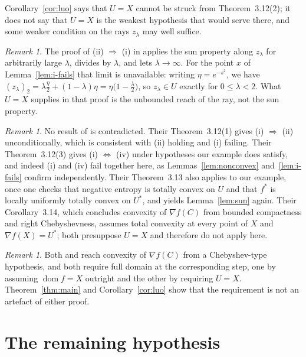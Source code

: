 \documentclass[11pt]{amsart}
\theoremstyle{plain}
\theoremstyle{definition}
\theoremstyle{remark}
\newtheorem{remark}[theorem]{Remark}
\newcommand{\dom}{\operatorname{dom}}
\begin{document}
Corollary~\ref{cor:luo} says that $U = X$ cannot be struck from
Theorem~3.12(2); it does not say that $U = X$ is the weakest hypothesis that
would serve there, and some weaker condition on the rays $z_{\lambda}$ may well
suffice.

\begin{remark}\label{rem:obstruction}
The proof of (ii) $\Rightarrow$ (i) in \cite[Theorem 3.12(2)]{LMWY2019} applies
the sun property along $z_{\lambda}$ for arbitrarily large $\lambda$, divides by
$\lambda$, and lets $\lambda \to \infty$. For the point $x$ of
Lemma~\ref{lem:i-fails} that limit is unavailable: writing $\eta = e^{-s^{2}}$,
we have $(z_{\lambda})_{2} = \lambda \tfrac{\eta}{2} + (1-\lambda)\eta =
\eta\bigl( 1 - \tfrac{\lambda}{2} \bigr)$, so $z_{\lambda} \in U$ exactly for
$0 \le \lambda < 2$. What $U = X$ supplies in that proof is the unbounded reach
of the ray, not the sun property.
\end{remark}

\begin{remark}
No result of \cite{LMWY2019} is contradicted. Their Theorem~3.12(1) gives
(i) $\Rightarrow$ (ii) unconditionally, which is consistent with (ii) holding and
(i) failing. Their Theorem~3.12(3) gives (i) $\Leftrightarrow$ (iv) under
hypotheses our example does satisfy, and indeed (i) and (iv) fail together here,
as Lemmas~\ref{lem:nonconvex} and~\ref{lem:i-fails} confirm independently. Their
Theorem~3.13 also applies to our example, once one checks that negative entropy
is totally convex on $U$ and that $f^{*}$ is locally uniformly totally convex on
$U^{*}$, and yields Lemma~\ref{lem:sun} again. Their Corollary~3.14, which
concludes convexity of
$\nabla f(C)$ from bounded compactness and right Chebyshevness, assumes total
convexity at every point of $X$ and $\nabla f(X) = U^{*}$; both presuppose
$U = X$ and therefore do not apply here.
\end{remark}

\begin{remark}
Both \cite[Fact 3.2]{BMW2010} and \cite[Theorem 3.12(2)]{LMWY2019} reach
convexity of $\nabla f(C)$ from a Chebyshev-type hypothesis, and both require
full domain at the corresponding step, one by assuming $\dom f = X$ outright and
the other by requiring $U = X$. Theorem~\ref{thm:main} and
Corollary~\ref{cor:luo} show that the requirement is not an artefact of either
proof.
\end{remark}

\section{The remaining hypothesis}\label{sec:b}
\end{document}
